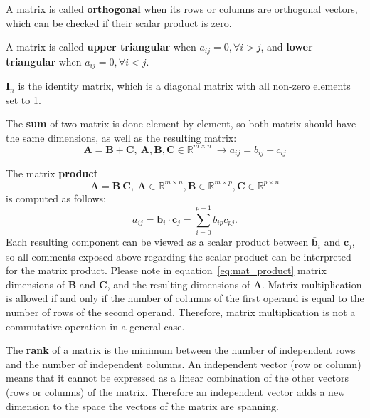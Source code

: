 A matrix is called \textbf{orthogonal} when its rows or columns are orthogonal vectors, which can be checked if their scalar product is zero.  

A matrix is called \textbf{upper triangular} when $a_{ij}=0, \forall i>j$, and \textbf{lower triangular} when $a_{ij}=0, \forall i<j$.

$\mathbf{I}_n$ is the identity matrix, which is a diagonal matrix with all non-zero elements set to 1. 

The \textbf{sum} of two matrix is done element by element, so both matrix should have the same dimensions, as well as the resulting matrix:
\begin{equation}
\mathbf{A} = \mathbf{B} + \mathbf{C}, \ \mathbf{A}, \mathbf{B}, \mathbf{C} \in \mathbb{R}^{m \times n} \ \rightarrow a_{ij} = b_{ij} + c_{ij}
\end{equation}

The matrix \textbf{product}
\begin{equation}
\mathbf{A} = \mathbf{B}\ \mathbf{C}, \ 
\mathbf{A} \in \mathbb{R}^{m \times n }, 
\mathbf{B} \in \mathbb{R}^{m \times p }, 
\mathbf{C} \in \mathbb{R}^{p \times n }
\label{eq:mat_product}
\end{equation}
is computed as follows: 
\begin{equation}
a_{ij} = \bar{\mathbf{b}}_i \cdot \mathbf{c}_j = \sum_{i=0}^{p-1} b_{ip} c_{pj}. 
\end{equation}
Each resulting component can be viewed as a scalar product between $\bar{\mathbf{b}}_i$ and $\mathbf{c}_j$, 
so all comments exposed above regarding the scalar product can be interpreted for the matrix product. Please note in equation~\ref{eq:mat_product} matrix dimensions of $\mathbf{B}$ and $\mathbf{C}$, and the resulting dimensions of $\mathbf{A}$. Matrix multiplication is allowed if and only if the number of columns of the first operand is equal to the number of rows of the second operand. Therefore, matrix multiplication is not a commutative operation in a general case. 

The \textbf{rank} of a matrix is the minimum between the number of independent rows and the number of independent columns. An independent vector (row or column) means that it cannot be expressed as a linear combination of the other vectors (rows or columns) of the matrix. Therefore an independent vector adds a new dimension to the space the vectors of the matrix are spanning. 

